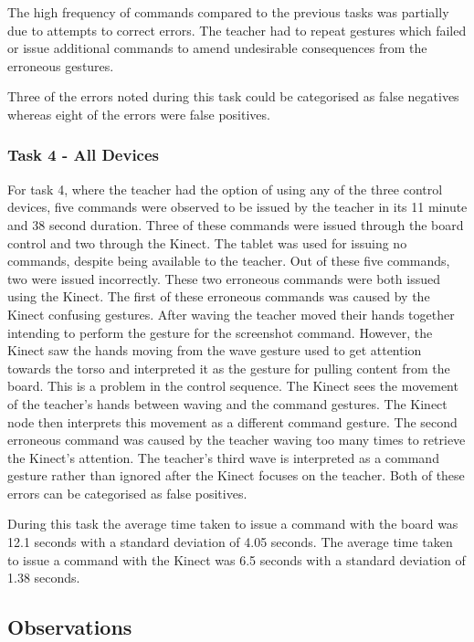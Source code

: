 \documentclass[link]{IWCOMP}
\begin{document}
The high frequency of commands compared to the previous tasks was partially due to attempts to correct errors.
The teacher had to repeat gestures which failed or issue additional commands to amend undesirable consequences from the erroneous gestures.

Three of the errors noted during this task could be categorised as false negatives whereas eight of the errors were false positives.

\subsubsection{Task 4 - All Devices}
\label{subsubsec:studyPhase1ResultsTask4}

For task 4, where the teacher had the option of using any of the three control devices, five commands were observed to be issued by the teacher in its 11 minute and 38 second duration.
Three of these commands were issued through the board control and two through the Kinect.
The tablet was used for issuing no commands, despite being available to the teacher.
Out of these five commands, two were issued incorrectly.
These two erroneous commands were both issued using the Kinect.
The first of these erroneous commands was caused by the Kinect confusing gestures.
After waving the teacher moved their hands together intending to perform the gesture for the screenshot command.
However, the Kinect saw the hands moving from the wave gesture used to get attention towards the torso and interpreted it as the gesture for pulling content from the board.
This is a problem in the control sequence.
The Kinect sees the movement of the teacher's hands between waving and the command gestures.
The Kinect node then interprets this movement as a different command gesture.
The second erroneous command was caused by the teacher waving too many times to retrieve the Kinect's attention.
The teacher's third wave is interpreted as a command gesture rather than ignored after the Kinect focuses on the teacher.
Both of these errors can be categorised as false positives.

During this task the average time taken to issue a command with the board was 12.1 seconds with a standard deviation of 4.05 seconds.
The average time taken to issue a command with the Kinect was 6.5 seconds with a standard deviation of 1.38 seconds.

\subsection{Observations}
\label{subsec:studyPhase1Observations}
\end{document}

